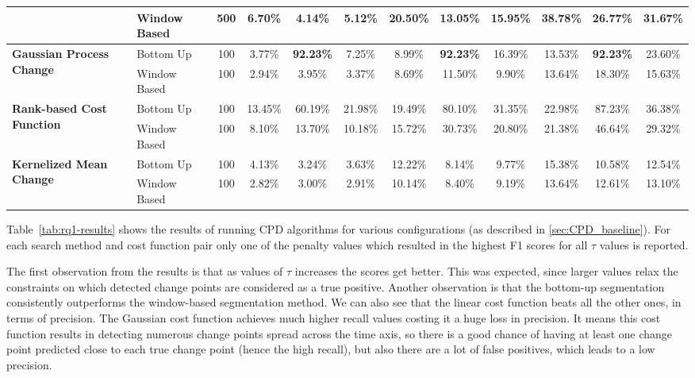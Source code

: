 \begin{table}
{\begin{tabular}{llcccccccccc}
                                                   & Window Based & 500  & 6.70\%     & 4.14\%     & 5.12\%    & 20.50\%    & 13.05\%    & 15.95\%   & 38.78\%    & 26.77\%    & 31.67\%   \\ \midrule
\multirow{2}{*}{\textbf{Gaussian Process Change}}  & Bottom Up    & 100  & 3.77\%     & \textbf{92.23\%}    & 7.25\%    & 8.99\%     & \textbf{92.23\%}    & 16.39\%   & 13.53\%    & \textbf{92.23\%}    & 23.60\%   \\
                                                   & Window Based & 100  & 2.94\%     & 3.95\%     & 3.37\%    & 8.69\%     & 11.50\%    & 9.90\%    & 13.64\%    & 18.30\%    & 15.63\%   \\ \midrule
\multirow{2}{*}{\textbf{Rank-based Cost Function}} & Bottom Up    & 100  & 13.45\%    & 60.19\%    & 21.98\%   & 19.49\%    & 80.10\%    & 31.35\%   & 22.98\%    & 87.23\%    & 36.38\%   \\
                                                   & Window Based & 100  & 8.10\%     & 13.70\%    & 10.18\%   & 15.72\%    & 30.73\%    & 20.80\%   & 21.38\%    & 46.64\%    & 29.32\%   \\ \midrule
\multirow{2}{*}{\textbf{Kernelized Mean Change}}   & Bottom Up    & 100  & 4.13\%     & 3.24\%     & 3.63\%    & 12.22\%    & 8.14\%     & 9.77\%    & 15.38\%    & 10.58\%    & 12.54\%   \\
                                                   & Window Based & 100  & 2.82\%     & 3.00\%     & 2.91\%    & 10.14\%    & 8.40\%     & 9.19\%    & 13.64\%    & 12.61\%    & 13.10\%   \\ \bottomrule

                                                   
\end{tabular}%
}
\end{table}

Table~\ref{tab:rq1-results} shows the results of running CPD algorithms for various configurations (as described in \ref{sec:CPD_baseline}). For each search method and cost function pair only one of the penalty values which resulted in the highest F1 scores for all $\tau$ values is reported. 

The first observation from the results is that as values of $\tau$ increases the scores get better. This was expected, since larger values relax the constraints on which detected change points are considered as a true positive. Another observation is that the bottom-up segmentation consistently outperforms the window-based segmentation method. We can also see that the linear cost function beats all the other ones, in terms of precision. The Gaussian cost function achieves much higher recall values costing it a huge loss in precision. It means this cost function results in detecting numerous change points spread across the time axis, so there is a good chance of having at least one change point predicted close to each true change point (hence the high recall), but also there are a lot of false positives, which leads to a low precision. 

